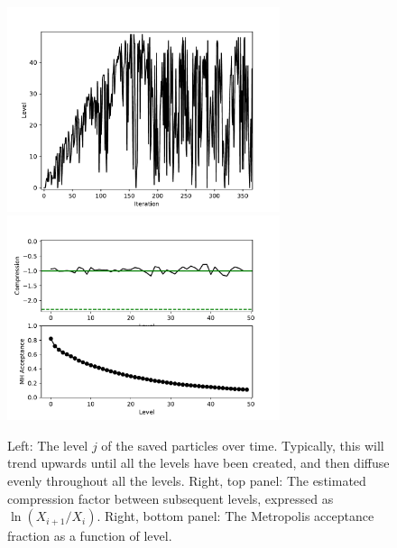 \documentclass[article]{jss}
\begin{document}
\begin{figure}[t!]
\centering
\includegraphics[width=8cm]{fig1.pdf}%
\includegraphics[width=8cm]{fig2.pdf}
\caption{Left: The level $j$ of the saved particles over time.
Typically, this will trend upwards until all the levels have
been created, and then diffuse evenly throughout all the levels.
Right, top panel: The estimated compression factor between subsequent
levels, expressed as $\ln(X_{i+1}/X_{i})$. Right, bottom panel:
The Metropolis acceptance fraction as a function of level.
\label{fig:fig1}}
\end{figure}
\end{document}
